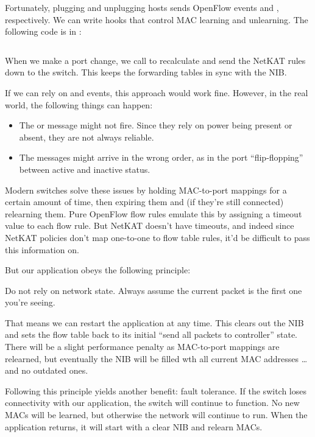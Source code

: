 Fortunately, plugging and unplugging hosts sends OpenFlow events  and ,
respectively.  We can write hooks that control MAC learning and unlearning.  The following
code is in :

\inputminted[firstline=60,lastline=69]{python}{code/l2_learning_switch/learning4.py}

When we make a port change, we call  to recalculate and send the NetKAT rules down to the 
switch.  This keeps the forwarding tables in sync with the NIB.  

If we can rely on  and  events, this approach would work fine.
However, in the real world, the following things can happen:

\begin{itemize}
\item The  or  message might not fire.  Since they rely on power being
present or absent, they are not always reliable.
\item The messages might arrive in the wrong order, as in the port ``flip-flopping'' between active and 
inactive status.
\end{itemize}

Modern switches solve these issues by holding MAC-to-port mappings for a certain amount of time, then 
expiring them and (if they're still connected) relearning them.  Pure OpenFlow flow rules emulate
this by assigning a timeout value to each flow rule.   But NetKAT doesn't have timeouts, and indeed since
NetKAT policies don't map one-to-one to flow table rules, it'd be difficult to pass this information on.

But our application obeys the following principle:

\setcounter{principle}{4}

\begin{principle}
Do not rely on network state.  Always assume the current packet is the first one you're seeing.   
\end{principle}
 
That means we can restart the application at any time.  This clears out the NIB and sets the flow table
back to its initial ``send all packets to controller'' state.  
There will be a slight performance penalty as MAC-to-port mappings are relearned, but eventually the
NIB will be filled wth all current MAC addresses \ldots and no outdated ones.

Following this principle yields another benefit: fault tolerance.  If the switch loses connectivity with 
our application, the switch will continue to function.  No new MACs will be learned, but otherwise the 
network will continue to run.  When the application returns, it will start with a clear NIB and relearn MACs.  

